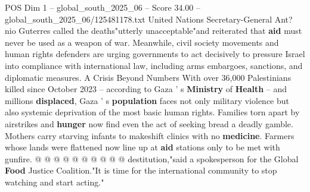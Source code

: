 \begin{textsample}{POS Dim 1 – global\_south\_2025\_06 – Score 34.00 – global\_south\_2025\_06/125481178.txt}
United Nations Secretary-General Ant? nio Guterres called the deaths"utterly unacceptable"and reiterated that \textbf{aid} must never be used as a weapon of war.
Meanwhile, civil society movements and human rights defenders are urging governments to act decisively to pressure Israel into compliance with international law, including arms embargoes, sanctions, and diplomatic measures.
A Crisis Beyond Numbers With over 36,000 Palestinians killed since October 2023 -- according to Gaza ' s \textbf{Ministry} of \textbf{Health} -- and millions \textbf{displaced}, Gaza ' s \textbf{population} faces not only military violence but also systemic deprivation of the most basic human rights.
Families torn apart by airstrikes and \textbf{hunger} now find even the act of seeking bread a deadly gamble.
Mothers carry starving infants to makeshift clinics with no \textbf{medicine}.
Farmers whose lands were flattened now line up at \textbf{aid} stations only to be met with gunfire. @ @ @ @ @ @ @ @ @ @ destitution,"said a spokesperson for the Global \textbf{Food} Justice Coalition."It is time for the international community to stop watching and start acting."

\end{textsample}
